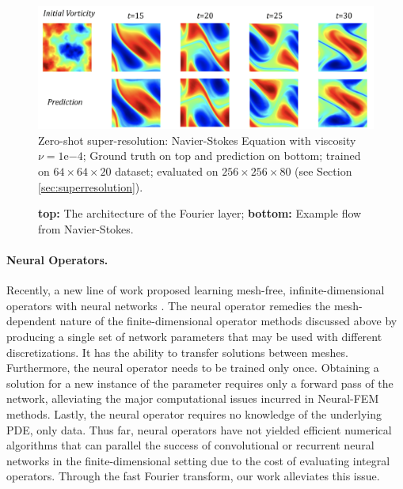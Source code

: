 \documentclass{article} %
\newcommand{\cG}{\mathcal{F}}
\begin{document}
\begin{figure}
    \centering
    \includegraphics[width=12cm]{figs/FourierNN_NV2.png}\\
    \small{
    Zero-shot super-resolution: Navier-Stokes Equation with viscosity $\nu=1\mathrm{e}{-4}$; Ground truth on top and prediction on bottom; trained on $64\times64\times20$ dataset; evaluated on $256\times256\times80$  (see Section \ref{sec:superresolution}).}
    \caption{ {\bf top:} The architecture of the Fourier layer; \textbf{bottom:} Example flow from Navier-Stokes.}
    \label{fig:1}
\end{figure}


\paragraph{Neural Operators.}
Recently, a new line of work proposed learning mesh-free, infinite-dimensional operators with neural networks
\citep{lu2019deeponet,Kovachki,nelsen2020random,li2020neural,li2020multipole, patel2021physics}.
The neural operator remedies the mesh-dependent nature of the finite-dimensional operator methods discussed above by producing a single set of network parameters that may be used with different discretizations. It has the ability to transfer solutions between meshes. 
Furthermore, the neural operator needs to be trained only once. Obtaining a solution for a new instance of the parameter requires only a forward pass of the network, alleviating the major computational issues incurred in Neural-FEM methods. 
Lastly, the neural operator requires no knowledge of the underlying PDE, only data. Thus far, neural operators have not yielded efficient numerical algorithms that can parallel the success of convolutional or recurrent neural networks in the finite-dimensional setting due to the cost of evaluating integral operators. Through the fast Fourier transform, our work alleviates this issue. 
\end{document}

